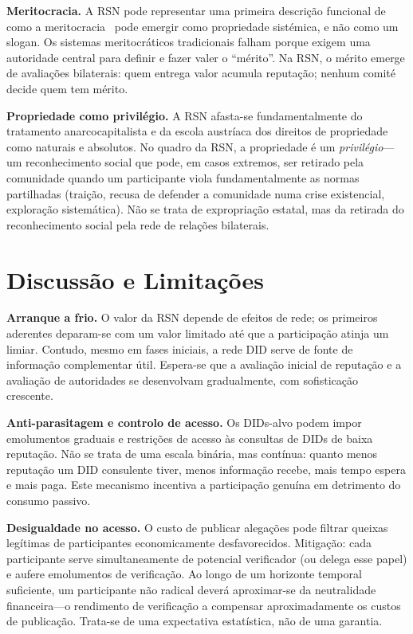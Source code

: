 \documentclass[11pt,a4paper,twocolumn]{article}
\begin{document}
\textbf{Meritocracia.} A RSN pode representar uma primeira descrição funcional de como a meritocracia~\cite{young1958} pode emergir como propriedade sistémica, e não como um slogan. Os sistemas meritocráticos tradicionais falham porque exigem uma autoridade central para definir e fazer valer o ``mérito''. Na RSN, o mérito emerge de avaliações bilaterais: quem entrega valor acumula reputação; nenhum comité decide quem tem mérito.

\textbf{Propriedade como privilégio.} A RSN afasta-se fundamentalmente do tratamento anarcocapitalista e da escola austríaca dos direitos de propriedade como naturais e absolutos. No quadro da RSN, a propriedade é um \emph{privilégio}---um reconhecimento social que pode, em casos extremos, ser retirado pela comunidade quando um participante viola fundamentalmente as normas partilhadas (traição, recusa de defender a comunidade numa crise existencial, exploração sistemática). Não se trata de expropriação estatal, mas da retirada do reconhecimento social pela rede de relações bilaterais.

\section{Discussão e Limitações}

\textbf{Arranque a frio.} O valor da RSN depende de efeitos de rede; os primeiros aderentes deparam-se com um valor limitado até que a participação atinja um limiar. Contudo, mesmo em fases iniciais, a rede DID serve de fonte de informação complementar útil. Espera-se que a avaliação inicial de reputação e a avaliação de autoridades se desenvolvam gradualmente, com sofisticação crescente.

\textbf{Anti-parasitagem e controlo de acesso.} Os DIDs-alvo podem impor emolumentos graduais e restrições de acesso às consultas de DIDs de baixa reputação. Não se trata de uma escala binária, mas contínua: quanto menos reputação um DID consulente tiver, menos informação recebe, mais tempo espera e mais paga. Este mecanismo incentiva a participação genuína em detrimento do consumo passivo.

\textbf{Desigualdade no acesso.} O custo de publicar alegações pode filtrar queixas legítimas de participantes economicamente desfavorecidos. Mitigação: cada participante serve simultaneamente de potencial verificador (ou delega esse papel) e aufere emolumentos de verificação. Ao longo de um horizonte temporal suficiente, um participante não radical deverá aproximar-se da neutralidade financeira---o rendimento de verificação a compensar aproximadamente os custos de publicação. Trata-se de uma expectativa estatística, não de uma garantia.
\end{document}
